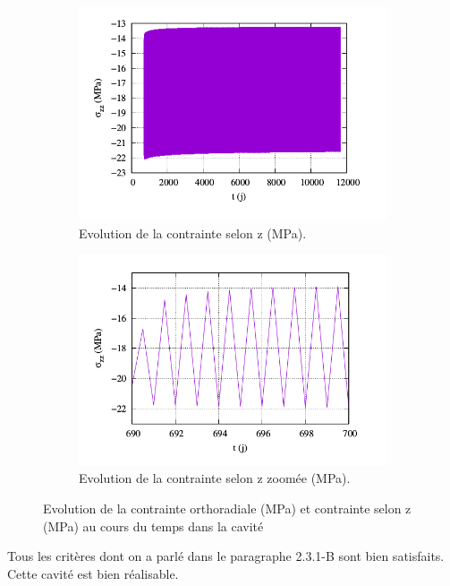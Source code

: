 \documentclass[11pt,french,a4paper]{article}
\begin{document}
\begin{figure}[h!]
    \begin{subfigure}[b]{0.42\linewidth}
        \includegraphics[width=\linewidth]{image/annexe/cav_sal/P2M_bon/szz.png}
        \caption{Evolution de la contrainte selon z (MPa).}
    \end{subfigure}
    \begin{subfigure}[b]{0.42\linewidth}
        \includegraphics[width=\linewidth]{image/annexe/cav_sal/P2M_bon/szz_zoom.png}
        \caption{Evolution de la contrainte selon z zoomée (MPa).}
    \end{subfigure}

    \caption{Evolution de la  contrainte orthoradiale (MPa) et contrainte selon z (MPa) au cours du temps dans la cavité}
    \label{fig:7 figures}
    \end{figure}
\FloatBarrier
Tous les critères dont on a parlé dans le paragraphe 2.3.1-B sont bien satisfaits. Cette cavité est bien réalisable.
\end{document}
